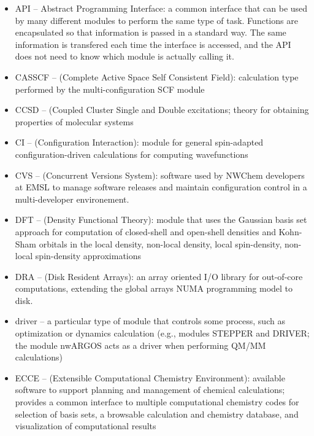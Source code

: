 \label{sec:glossary}

\begin{itemize}

\item API -- Abstract Programming Interface: a common interface
that can be used by many different modules to perform the same type of task.
Functions are encapsulated so that information is passed in a standard
way.  The same information is transfered each time the interface is
accessed, and the API does not need to know which module is actually
calling it.

\item CASSCF -- (Complete Active Space Self Consistent Field): calculation
type performed by the multi-configuration SCF module

\item CCSD -- (Coupled Cluster Single and Double excitations; theory for
obtaining properties of molecular systems

\item CI -- (Configuration Interaction): module for general spin-adapted
configuration-driven calculations for computing wavefunctions

\item CVS -- (Concurrent Versions System): software used by NWChem developers
at EMSL to manage software releases and maintain configuration control in
a multi-developer environement.

\item DFT -- (Density Functional Theory): module that uses the Gaussian basis
set approach for computation of closed-shell and open-shell densities and 
Kohn-Sham orbitals in the local density, non-local density, local spin-density,
non-local spin-density approximations

\item DRA -- (Disk Resident Arrays): an array oriented I/O library for
out-of-core computations, extending the global arrays NUMA programming model 
to disk.

\item driver -- a particular type of module that controls some process, such 
as optimization or dynamics calculation  (e.g., modules STEPPER and DRIVER; 
the module nwARGOS acts as a driver when performing QM/MM calculations)

\item ECCE -- (Extensible Computational Chemistry Environment): available 
software to support planning and management of chemical calculations;
provides a common interface to multiple computational chemistry codes
for selection of basis sets, a browsable calculation and chemistry database,
and visualization of computational results


\end{itemize}
